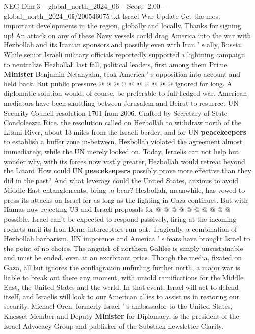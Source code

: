 \begin{textsample}{NEG Dim 3 – global\_north\_2024\_06 – Score -2.00 – global\_north\_2024\_06/200546075.txt}
Israel War Update Get the most important developments in the region, globally and locally.
Thanks for signing up!
An attack on any of these Navy vessels could drag America into the war with Hezbollah and its Iranian sponsors and possibly even with Iran ' s ally, Russia.
While senior Israeli military officials reportedly supported a lightning campaign to neutralize Hezbollah last fall, political leaders, first among them Prime \textbf{Minister} Benjamin Netanyahu, took America ' s opposition into account and held back.
But public pressure @ @ @ @ @ @ @ @ @ @ ignored for long.
A diplomatic solution would, of course, be preferable to full-fledged war.
American mediators have been shuttling between Jerusalem and Beirut to resurrect UN Security Council resolution 1701 from 2006.
Crafted by Secretary of State Condoleezza Rice, the resolution called on Hezbollah to withdraw north of the Litani River, about 13 miles from the Israeli border, and for UN \textbf{peacekeepers} to establish a buffer zone in-between.
Hezbollah violated the agreement almost immediately, while the UN merely looked on.
Today, Israelis can not help but wonder why, with its forces now vastly greater, Hezbollah would retreat beyond the Litani.
How could UN \textbf{peacekeepers} possibly prove more effective than they did in the past?
And what leverage could the United States, anxious to avoid Middle East entanglements, bring to bear?
Hezbollah, meanwhile, has vowed to press its attacks on Israel for as long as the fighting in Gaza continues.
But with Hamas now rejecting US and Israeli proposals for @ @ @ @ @ @ @ @ @ @ possible.
Israel can't be expected to respond passively, firing at the incoming rockets until its Iron Dome interceptors run out.
Tragically, a combination of Hezbollah barbarism, UN impotence and America ' s fears have brought Israel to the point of no choice.
The anguish of northern Galilee is simply unsustainable and must be ended, even at an exorbitant price.
Though the media, fixated on Gaza, all but ignores the conflagration unfurling further north, a major war is liable to break out there any moment, with untold ramifications for the Middle East, the United States and the world.
In that event, Israel will act to defend itself, and Israelis will look to our American allies to assist us in restoring our security.
Michael Oren, formerly Israel ' s ambassador to the United States, Knesset Member and Deputy \textbf{Minister} for Diplomacy, is the president of the Israel Advocacy Group and publisher of the Substack newsletter Clarity.

\end{textsample}
